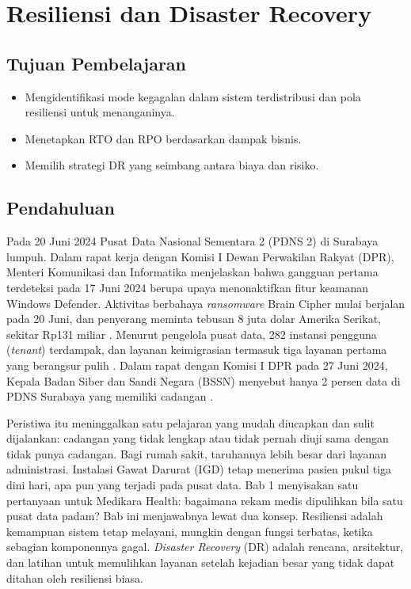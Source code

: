 \chapter{Resiliensi dan Disaster Recovery}
\label{ch:ch12}



\section*{Tujuan Pembelajaran}
\begin{itemize}
  \item Mengidentifikasi mode kegagalan dalam sistem terdistribusi dan pola resiliensi untuk
        menanganinya.
  \item Menetapkan RTO dan RPO berdasarkan dampak bisnis.
  \item Memilih strategi DR yang seimbang antara biaya dan risiko.
\end{itemize}

\section{Pendahuluan}

Pada 20 Juni 2024 Pusat Data Nasional Sementara 2 (PDNS 2) di Surabaya lumpuh. Dalam rapat kerja
dengan Komisi I Dewan Perwakilan Rakyat (DPR), Menteri Komunikasi dan Informatika menjelaskan bahwa
gangguan pertama terdeteksi pada 17 Juni 2024 berupa upaya menonaktifkan fitur keamanan Windows
Defender. Aktivitas berbahaya \textit{ransomware} Brain Cipher mulai berjalan pada 20 Juni, dan
penyerang meminta tebusan 8 juta dolar Amerika Serikat, sekitar Rp131 miliar \cite{c12-antara2024}.
Menurut pengelola pusat data, 282 instansi pengguna (\textit{tenant}) terdampak, dan layanan
keimigrasian termasuk tiga layanan pertama yang berangsur pulih \cite{c12-cnn2024}. Dalam rapat
dengan Komisi I DPR pada 27 Juni 2024, Kepala Badan Siber dan Sandi Negara (BSSN) menyebut hanya 2
persen data di PDNS Surabaya yang memiliki cadangan \cite{c12-cnbc2024}.

Peristiwa itu meninggalkan satu pelajaran yang mudah diucapkan dan sulit dijalankan: cadangan yang
tidak lengkap atau tidak pernah diuji sama dengan tidak punya cadangan. Bagi rumah sakit,
taruhannya lebih besar dari layanan administrasi. Instalasi Gawat Darurat (IGD) tetap menerima
pasien pukul tiga dini hari, apa pun yang terjadi pada pusat data. Bab 1 menyisakan satu pertanyaan
untuk Medikara Health: bagaimana rekam medis dipulihkan bila satu pusat data padam? Bab ini
menjawabnya lewat dua konsep. Resiliensi adalah kemampuan sistem tetap melayani, mungkin dengan
fungsi terbatas, ketika sebagian komponennya gagal. \textit{Disaster Recovery} (DR) adalah rencana,
arsitektur, dan latihan untuk memulihkan layanan setelah kejadian besar yang tidak dapat ditahan
oleh resiliensi biasa.

